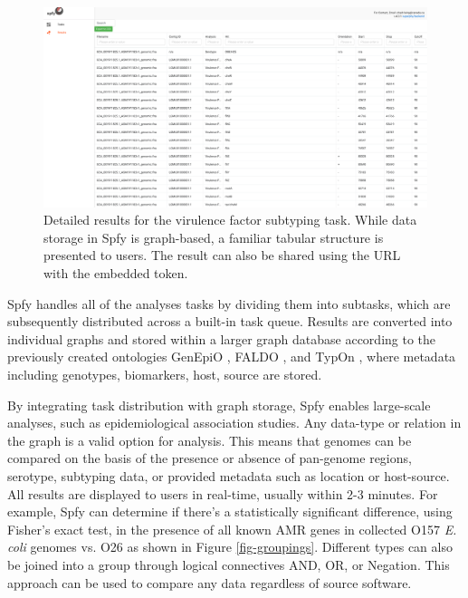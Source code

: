 \documentclass{article}
\begin{document}
\begin{figure}[!htb]
\begin{center}{}
\includegraphics[width=\textwidth]{images/tables.png}
\end{center}
\caption{Detailed results for the virulence factor subtyping task. While data storage in Spfy is graph-based, a familiar tabular structure is presented to users. The result can also be shared using the URL with the embedded token.}
\label{fig-tables}
\end{figure}

Spfy handles all of the analyses tasks by dividing them into subtasks, which are subsequently distributed across a built-in task queue. Results are converted into individual graphs and stored within a larger graph database according to the previously created ontologies GenEpiO \cite{griffiths2017context}, FALDO \cite{bolleman2016faldo}, and TypOn \cite{vaz2014typon}, where metadata including genotypes, biomarkers, host, source are stored.

By integrating task distribution with graph storage, Spfy enables large-scale analyses, such as epidemiological association studies. Any data-type or relation in the graph is a valid option for analysis. This means that genomes can be compared on the basis of the presence or absence of pan-genome regions, serotype, subtyping data, or provided metadata such as location or host-source. All results are displayed to users in real-time, usually within 2-3 minutes.
For example, Spfy can determine if there's a statistically significant difference, using Fisher's exact test, in the presence of all known AMR genes in collected O157 \textit{E. coli} genomes vs. O26 as shown in Figure \ref{fig-groupings}.
Different types can also be joined into a group through logical connectives AND, OR, or Negation. This approach can be used to compare any data regardless of source software.
\end{document}
